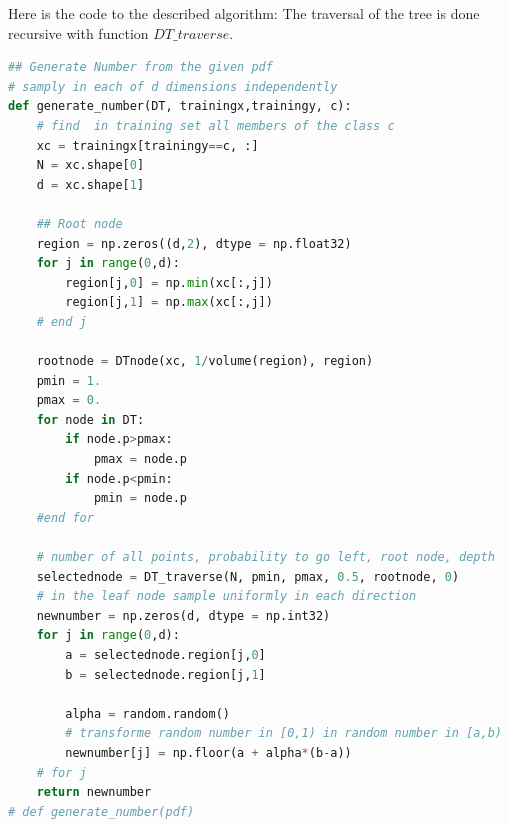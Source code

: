 \documentclass{article}
\begin{document}
Here is the code to the described algorithm:
The traversal of the tree is done recursive with function $DT\_traverse$.

\begin{lstlisting}[language=Python]
## Generate Number from the given pdf
# samply in each of d dimensions independently
def generate_number(DT, trainingx,trainingy, c):
    # find  in training set all members of the class c
    xc = trainingx[trainingy==c, :]        
    N = xc.shape[0]
    d = xc.shape[1]

    ## Root node
    region = np.zeros((d,2), dtype = np.float32)
    for j in range(0,d):
        region[j,0] = np.min(xc[:,j])
        region[j,1] = np.max(xc[:,j])
    # end j   
        
    rootnode = DTnode(xc, 1/volume(region), region)
    pmin = 1.
    pmax = 0.
    for node in DT:
        if node.p>pmax:
            pmax = node.p
        if node.p<pmin:
            pmin = node.p
    #end for    
        
    # number of all points, probability to go left, root node, depth
    selectednode = DT_traverse(N, pmin, pmax, 0.5, rootnode, 0) 
    # in the leaf node sample uniformly in each direction
    newnumber = np.zeros(d, dtype = np.int32) 
    for j in range(0,d):
        a = selectednode.region[j,0]
        b = selectednode.region[j,1]
        
        alpha = random.random()
        # transforme random number in [0,1) in random number in [a,b)
        newnumber[j] = np.floor(a + alpha*(b-a))
    # for j    
    return newnumber
# def generate_number(pdf)    
\end{lstlisting}
\end{document}
